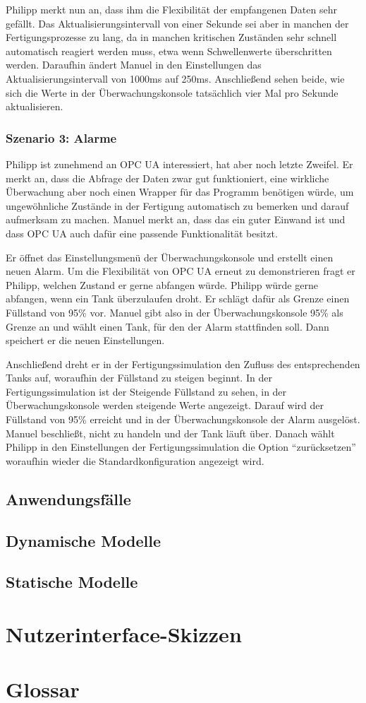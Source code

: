 \documentclass[parskip=full]{scrartcl}
\begin{document}
Philipp merkt nun an, dass ihm die Flexibilität der empfangenen Daten sehr gefällt. Das Aktualisierungsintervall von
einer Sekunde sei aber in manchen der Fertigungsprozesse zu lang, da in manchen kritischen Zuständen sehr schnell
automatisch reagiert werden muss, etwa wenn Schwellenwerte überschritten werden. Daraufhin ändert Manuel in den
Einstellungen das Aktualisierungsintervall von 1000ms auf 250ms. Anschließend sehen beide, wie sich die Werte in der
Überwachungskonsole tatsächlich vier Mal pro Sekunde aktualisieren.

\subsubsection{Szenario 3: Alarme}
Philipp ist zunehmend an OPC UA interessiert, hat aber noch letzte Zweifel. Er merkt an, dass die Abfrage der Daten
zwar gut funktioniert, eine wirkliche \"Uberwachung aber noch einen Wrapper f\"ur das Programm ben\"otigen w\"urde,
um ungew\"ohnliche Zust\"ande in der Fertigung automatisch zu bemerken und darauf aufmerksam zu machen.
Manuel merkt an, dass das ein guter Einwand ist und dass OPC UA auch daf\"ur eine passende Funktionalit\"at besitzt.

Er \"offnet das Einstellungsmen\"u der \"Uberwachungskonsole und erstellt einen neuen Alarm. Um die Flexibilit\"at
von OPC UA erneut zu demonstrieren fragt er Philipp, welchen Zustand er gerne abfangen w\"urde. Philipp w\"urde gerne
abfangen, wenn ein Tank \"uberzulaufen droht. Er schl\"agt daf\"ur als Grenze einen F\"ullstand von 95\% vor.
Manuel gibt also in der \"Uberwachungskonsole 95\% als Grenze an und w\"ahlt einen Tank, f\"ur den der Alarm stattfinden soll.
Dann speichert er die neuen Einstellungen.

Anschlie{\ss}end dreht er in der Fertigungssimulation den Zufluss des entsprechenden Tanks auf, woraufhin der F\"ullstand
zu steigen beginnt. In der Fertigungssimulation ist der Steigende F\"ullstand zu sehen, in der \"Uberwachungskonsole werden
steigende Werte angezeigt.
Darauf wird der F\"ullstand von 95\% erreicht und in der \"Uberwachungskonsole der Alarm ausgel\"ost. Manuel
beschlie{\ss}t, nicht zu handeln und der Tank l\"auft \"uber. Danach w\"ahlt Philipp in den Einstellungen der
Fertigungssimulation die Option ``zur\"ucksetzen'' woraufhin wieder die Standardkonfiguration angezeigt wird.

\subsection{Anwendungsfälle}
\Blindtext[1]

\subsection{Dynamische Modelle}
\Blindtext[1]

\subsection{Statische Modelle}
\Blindtext[1]

\section{Nutzerinterface-Skizzen}
\Blindtext[1]

\section{Glossar}
\Blindtext[1]
\end{document}
